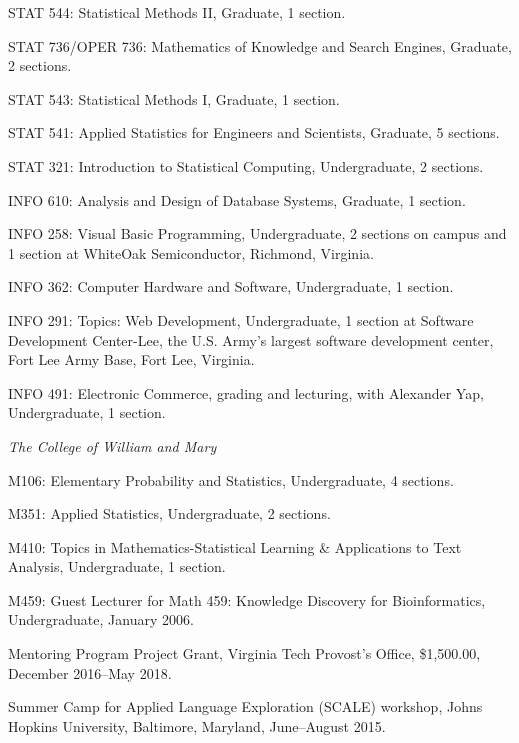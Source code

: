 \documentclass[11pt,article,oneside]{memoir}
\begin{document}
\ind STAT 544: Statistical Methods II, Graduate, 1 section.

\ind STAT 736/OPER 736: Mathematics of Knowledge and Search Engines, Graduate, 2 sections.

\ind STAT 543: Statistical Methods I, Graduate, 1 section.

\ind STAT 541: Applied Statistics for Engineers and Scientists, Graduate, 5 sections.

\ind STAT 321: Introduction to Statistical Computing, Undergraduate, 2 sections.

\ind INFO 610: Analysis and Design of Database Systems, Graduate, 1 section.

\ind INFO 258: Visual Basic Programming, Undergraduate, 2 sections on campus and 1 section at WhiteOak Semiconductor, Richmond, Virginia.

\ind INFO 362: Computer Hardware and Software, Undergraduate, 1 section.

\ind INFO 291: Topics: Web Development, Undergraduate, 1 section at Software Development Center-Lee, the U.S. Army’s largest software development center, Fort Lee Army Base, Fort Lee, Virginia.

\ind INFO 491: Electronic Commerce, grading and lecturing, with Alexander Yap, Undergraduate, 1 section. 



\bigskip

\noindent\emph{The College of William and Mary \vspace{0.05in}}

\ind M106: Elementary Probability and Statistics, Undergraduate, 4 sections.

\ind M351: Applied Statistics, Undergraduate, 2 sections.

\ind M410: Topics in Mathematics-Statistical Learning \& Applications to Text Analysis, Undergraduate, 1 section.

\ind M459: Guest Lecturer for Math 459: Knowledge Discovery for Bioinformatics, Undergraduate, January 2006.

\bigskip


\ind Mentoring Program Project Grant, Virginia Tech Provost's Office, \$1,500.00, December 2016--May 2018.

\ind Summer Camp for Applied Language Exploration (SCALE) workshop, Johns Hopkins University, Baltimore, Maryland, June--August 2015.
\end{document}
